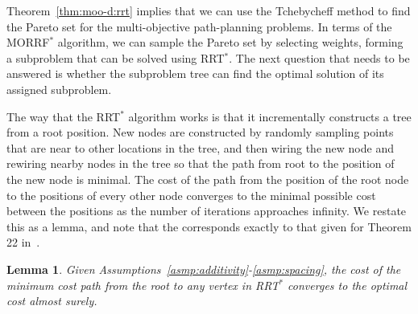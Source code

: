 \documentclass{article}
\newtheorem{lem}{Lemma}
\begin{document}
Theorem~\ref{thm:moo-d:rrt} implies that we can use the Tchebycheff method to find the Pareto set for the multi-objective path-planning problems.  
In terms of the MORRF$^{*}$ algorithm, we can sample the Pareto set by selecting weights, forming a subproblem that can be solved using RRT$^{*}$. 
The next question that needs to be answered is whether the subproblem tree can find the optimal solution of its assigned subproblem.

The way that the RRT$^{*}$ algorithm works is that it incrementally constructs a tree from a root position.  
New nodes are constructed by randomly sampling points that are near to other locations in the tree, and then wiring the new node and rewiring nearby nodes in the tree so that the path from root to the position of the new node is minimal.  
The cost of the path from the position of the root node to the positions of every other node converges to the minimal possible cost between the positions as the number of iterations approaches infinity.  
We restate this as a lemma, and note that the corresponds exactly to that given for Theorem 22 in~\cite{Karaman.Frazzoli:RSS10}.
\begin{lem}
\label{lem:tree_vex:conv}
Given Assumptions~\ref{asmp:additivity}-\ref{asmp:spacing},
the cost of the minimum cost path from the root to any vertex in RRT$^{*}$ converges to the optimal cost almost surely.
\end{lem}
  

\end{document}
